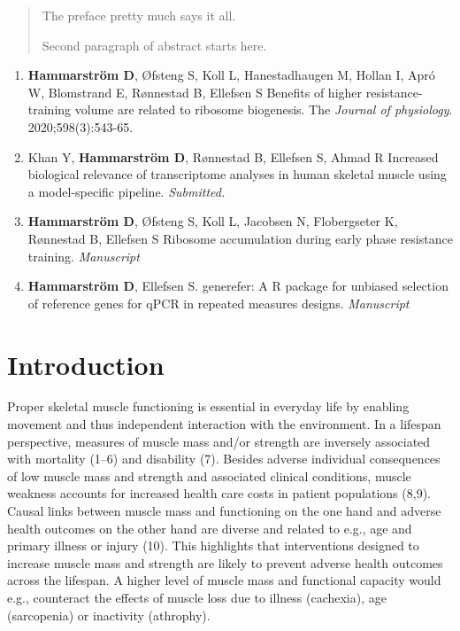 \documentclass[twoside,10pt]{gihclass} %
\def\labelenumi{\Roman{enumi}.}
\begin{document}
  \begin{abstract}
    The preface pretty much says it all.
    
    \par
    
    Second paragraph of abstract starts here.
  \end{abstract}
  \begin{listofpapers}
    \begin{enumerate}
    \def\labelenumi{\Roman{enumi}.}
    \item
      \textbf{Hammarström D}, Øfsteng S, Koll L, Hanestadhaugen M, Hollan I, Apró W, Blomstrand E, Rønnestad B, Ellefsen S Benefits of higher resistance-training volume are related to ribosome biogenesis. The \emph{Journal of physiology}. 2020;598(3):543-65.
    \item
      Khan Y, \textbf{Hammarström D}, Rønnestad B, Ellefsen S, Ahmad R Increased biological relevance of transcriptome analyses in human skeletal muscle using a model-specific pipeline. \emph{Submitted.}
    \item
      \textbf{Hammarström D}, Øfsteng S, Koll L, Jacobsen N, Flobergseter K, Rønnestad B, Ellefsen S Ribosome accumulation during early phase resistance training. \emph{Manuscript}
    \item
      \textbf{Hammarström D}, Ellefsen S. generefer: A R package for unbiased selection of reference genes for qPCR in repeated measures designs. \emph{Manuscript}
    \end{enumerate}
  \end{listofpapers}

  \hypersetup{linkcolor=black}
  \setcounter{tocdepth}{2}
  \tableofcontents

  \listoftables

  \listoffigures




\mainmatter %
\pagestyle{fancyplain} %

\hypertarget{introduction}{%
\chapter{Introduction}\label{introduction}}

Proper skeletal muscle functioning is essential in everyday life by enabling movement and thus independent interaction with the environment. In a lifespan perspective, measures of muscle mass and/or strength are inversely associated with mortality
(1--6)
and disability
(7).
Besides adverse individual consequences of low muscle mass and strength and associated clinical conditions, muscle weakness accounts for increased health care costs in patient populations
(8,9).
Causal links between muscle mass and functioning on the one hand and adverse health outcomes on the other hand are diverse and related to e.g., age and primary illness or injury
(10).
This highlights that interventions designed to increase muscle mass and strength are likely to prevent adverse health outcomes across the lifespan. A higher level of muscle mass and functional capacity would e.g., counteract the effects of muscle loss due to illness (cachexia), age (sarcopenia) or inactivity (athrophy).
\end{document}
